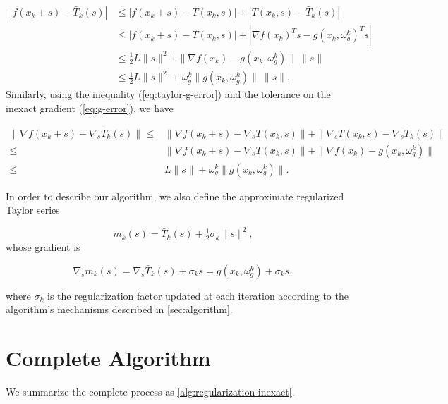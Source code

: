 \documentclass[runningheads,orivec,oribibl]{llncs}
\begin{document}
\begin{align}
  \label{eq:inexact-taylor-f-error}
  |f(x_k+s)-\bar{T}_k(s)|
  & \leq |f(x_k+s) - T(x_k,s)| + |T(x_k,s) - \bar{T}_k(s)| \nonumber \\
  & \leq |f(x_k+s) - T(x_k,s)| + |\nabla f(x_k)^Ts - g(x_k,\omega_g^k)^Ts|
  \nonumber \\
  & \leq \tfrac{1}{2}L\|s\|^2 + \|\nabla f(x_k) - g(x_k,\omega_g^k)\| \ \|s\| \nonumber \\
  & \leq \tfrac{1}{2}L\|s\|^2 + \omega_g^k \|g(x_k,\omega_g^k)\| \ \|s\|.
\end{align}
Similarly, using the inequality (\ref{eq:taylor-g-error}) and the tolerance on the inexact gradient (\ref{eq:g-error}), we have

\begin{align}
  \label{eq:inexact-taylor-g-error}
  \|\nabla f(x_k+s) - \nabla_s \bar{T}_k(s)\|
  \leq & \|\nabla f(x_k+s) - \nabla_s T(x_k,s)\| + \|\nabla_s T(x_k,s) - \nabla_s \bar{T}_k(s)\| \nonumber \\
  \leq &\|\nabla f(x_k+s) - \nabla_s T(x_k,s)\| + \|\nabla f(x_k) - g(x_k,\omega_g^k)\| \nonumber \\
  \leq &L\|s\| + \omega_g^k \|g(x_k,\omega_g^k)\|.
\end{align}

\noindent In order to describe our algorithm, we also define the approximate regularized Taylor series

\begin{equation}
  \label{eq:model}
  m_k(s) = \bar{T}_k(s)+\tfrac{1}{2}\sigma_k\|s\|^2,
\end{equation}
whose gradient is

\begin{equation*}
  \nabla_s m_k(s)= \nabla_s \bar{T}_k(s) +\sigma_k s = g(x_k,\omega_g^k) + \sigma_k s,
\end{equation*}

\noindent where \(\sigma_k\) is the regularization factor updated at each iteration according to the algorithm's mechanisms described in \autoref{sec:algorithm}.


\section{Complete Algorithm}
\label{sec:algorithm}

We summarize the complete process as \autoref{alg:regularization-inexact}.
\end{document}
